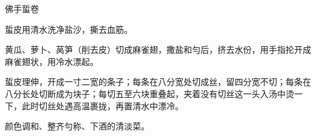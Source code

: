 \begin{recipe}{佛手蜇卷}

\ingredients


\cooking

\step 蜇皮用清水洗净盐沙，撕去血筋。

\step 黄瓜、萝卜、莴笋（削去皮）切成麻雀翅，撒盐和勻后，挤去水份，用手指抡开成麻雀翅状，用冷水漂起。

\step 蜇皮理伸，开成一寸二宽的条子；每条在八分宽处切成丝，留四分宽不切；每条在八分长处切断成为块子；每切五至六块重叠起，夹着没有切丝这一头入汤中烫一下，此时切丝处遇高温裹拢，再置清水中漂冷。

\notes

颜色调和、整齐勻称、下酒的清淡菜。

\end{recipe}

